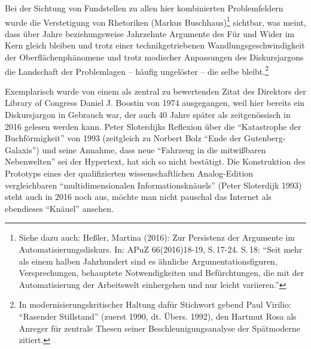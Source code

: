 \documentclass[a4paper,
fontsize=11pt,
oneside,
numbers=noperiodatend,
parskip=half-,
bibliography=totoc,
final
]{scrartcl}
\begin{document}
Bei der Sichtung von Fundstellen zu allen hier kombinierten
Problemfeldern wurde die Verstetigung von Rhetoriken (Markus
Buschhaus)\footnote{Siehe dazu auch: Heßler, Martina (2016): Zur
  Persistenz der Argumente im Automatisierungsdiskurs. In: APuZ
  66(2016)18-19, S.\,17-24. S.\,18: \enquote{Seit mehr als einem halben
  Jahrhundert sind es ähnliche Argumentationsfiguren, Versprechungen,
  behauptete Notwendigkeiten und Befürchtungen, die mit der
  Automatisierung der Arbeitswelt einhergehen und nur leicht variieren.}}
sichtbar, was meint, dass über Jahre beziehungsweise Jahrzehnte
Argumente des Für und Wider im Kern gleich bleiben und trotz einer
technikgetriebenen Wandlungsgeschwindigkeit der Oberflächenphänomene und
trotz modischer Anpassungen des Diskursjargons die Landschaft der
Problemlagen -- häufig ungelöster -- die selbe bleibt.\footnote{In
  modernisierungskritischer Haltung dafür Stichwort gebend Paul Virilio:
  \enquote{Rasender Stillstand} (zuerst 1990, dt. Übers. 1992), den
  Hartmut Rosa als Anreger für zentrale Thesen seiner
  Beschleunigungsanalyse der Spätmoderne zitiert.}

Exemplarisch wurde von einem als zentral zu bewertenden Zitat des
Direktors der Library of Congress Daniel J. Boostin von 1974
ausgegangen, weil hier bereits ein Diskursjargon in Gebrauch war, der
auch 40 Jahre später als zeitgenössisch in 2016 gelesen werden kann.
Peter Sloterdijks Reflexion über die \enquote{Katastrophe der
Buchförmigkeit} von 1993 (zeitgleich zu Norbert Bolz \enquote{Ende der
Gutenberg-Galaxis}) und seine Annahme, dass neue \enquote{Fahrzeug in
die mitwißbaren Nebenwelten} sei der Hypertext, hat sich so nicht
bestätigt. Die Konstruktion des Prototyps eines der qualifizierten
wissenschaftlichen Analog-Edition vergleichbaren
\enquote{multidimensionalen Informationsknäuels} (Peter Sloterdijk 1993)
steht auch in 2016 noch aus, möchte man nicht pauschal das Internet als
ebendieses \enquote{Knäuel} ansehen.
\end{document}
